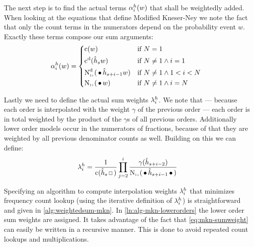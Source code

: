 The next step is to find the actual terms $\alpha_i^h(w)$ that shall be
weightedly added.
When looking at the equations that define Modified Kneser-Ney we note the fact
that only the count terms in the numerators depend on the probability event $w$.
Exactly these terms compose our sum arguments:
\begin{equation}
  \SumArg_i^h(w) =
    \begin{dcases*}
      \Count(w)                                             & if $N = 1$ \\
      \DiscountedCount(\DerivedHistory[s] w)                & if $N \neq 1 \land i = 1$ \\
      \DiscountedCount*(\WSkp \DerivedHistory[s + i - 1] w) & if $N \neq 1 \land 1 < i < N$ \\
      \ContCountIp(\WSkp w)                                 & if $N \neq 1 \land i = N$
    \end{dcases*}
\end{equation}

Lastly we need to define the actual sum weights $\lambda_i^h$.
We note that --- because each order is interpolated with the weight $\gamma$ of
the previous order --- each order is in total weighted by the product of the
$\gamma$s of all previous orders.
Additionally lower order models occur in the numerators of fractions, because of
that they are weighted by all previous denominator counts as well.
Building on this we can define:
\begin{equation}
  \label{eq:mkn-sumweight}
  \SumWeight_i^h = \frac{1}{\Count(\DerivedHistory[s] \Skp)} \prod_{j = 2}^i \frac{\gamma(\DerivedHistory[s+i-2])}{\ContCountIp(\WSkp \DerivedHistory[s+i-1] \WSkp)}
\end{equation}

Specifying an algorithm to compute interpolation weights $\lambda_i^h$ that
minimizes frequency count lookup (using the iterative definition of
$\lambda_i^h$) is straightforward and given in \cref{alg:weightedsum-mkn}.
In \cref{ln:alg-mkn-lowerorders} the lower order sum weights are assigned.
It takes advantage of the fact that \cref{eq:mkn-sumweight} can easily be
written in a recursive manner.
This is done to avoid repeated count lookups and multiplications.

